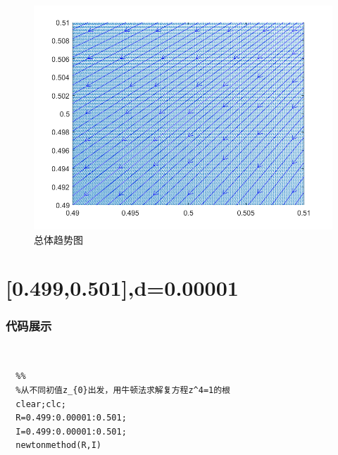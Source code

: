 \documentclass[UTF8,a4paper,10pt]{ctexart}
\begin{document}
 \newline
	\begin{figure}[!htbp]
		\centering
		\includegraphics[width=1\textwidth,height=1\textwidth]{pictures/3_3.png}
		\caption{总体趋势图} \label{3_3}
	\end{figure}


\section{[0.499,0.501]\times [0.499,0.501],d=0.00001}
\subsubsection{代码展示}
~\\
\lstset{language=matlab}
\begin{lstlisting}
  %%
  %从不同初值z_{0}出发，用牛顿法求解复方程z^4=1的根
  clear;clc;
  R=0.499:0.00001:0.501;
  I=0.499:0.00001:0.501;
  newtonmethod(R,I)
\end{lstlisting}
\end{document}

